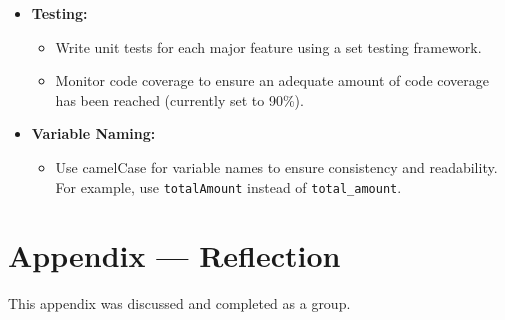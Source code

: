 \documentclass{article}
\begin{document}
\begin{itemize}
    \item \textbf{Testing:}
    \begin{itemize}
        \item Write unit tests for each major feature using a set testing framework.
        \item Monitor code coverage to ensure an adequate amount of code coverage has been reached (currently set to 90\%).
    \end{itemize}
    \item \textbf{Variable Naming:}
  \begin{itemize}
      \item Use camelCase for variable names to ensure consistency and readability. For example, use \texttt{totalAmount} instead of \texttt{total\_amount}.
  \end{itemize}
\end{itemize}

\newpage{}

\section*{Appendix --- Reflection}

This appendix was discussed and completed as a group.
\end{document}
